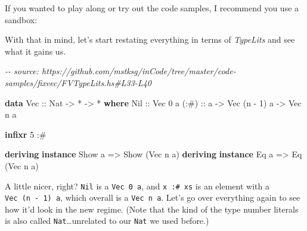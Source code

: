 \documentclass[]{article}
\newenvironment{Shaded}{}{}
\newcommand{\CommentTok}[1]{\textcolor[rgb]{0.38,0.63,0.69}{\textit{#1}}}
\newcommand{\DataTypeTok}[1]{\textcolor[rgb]{0.56,0.13,0.00}{#1}}
\newcommand{\DecValTok}[1]{\textcolor[rgb]{0.25,0.63,0.44}{#1}}
\newcommand{\ExtensionTok}[1]{#1}
\newcommand{\KeywordTok}[1]{\textcolor[rgb]{0.00,0.44,0.13}{\textbf{#1}}}
\newcommand{\NormalTok}[1]{#1}
\newcommand{\OperatorTok}[1]{\textcolor[rgb]{0.40,0.40,0.40}{#1}}
\newcommand{\OtherTok}[1]{\textcolor[rgb]{0.00,0.44,0.13}{#1}}
\begin{document}
If you wanted to play along or try out the code samples, I recommend you use a
sandbox:

\begin{Shaded}
\end{Shaded}

With that in mind, let's start restating everything in terms of \emph{TypeLits}
and see what it gains us.

\begin{Shaded}
\begin{Highlighting}[]
\CommentTok{{-}{-} source: https://github.com/mstksg/inCode/tree/master/code{-}samples/fixvec/FVTypeLits.hs\#L33{-}L40}

\KeywordTok{data} \DataTypeTok{Vec}\OtherTok{ ::} \DataTypeTok{Nat} \OtherTok{{-}\textgreater{}} \OperatorTok{*} \OtherTok{{-}\textgreater{}} \OperatorTok{*} \KeywordTok{where}
    \DataTypeTok{Nil}\OtherTok{  ::} \DataTypeTok{Vec} \DecValTok{0}\NormalTok{ a}
\OtherTok{    (:\#) ::}\NormalTok{ a }\OtherTok{{-}\textgreater{}} \DataTypeTok{Vec}\NormalTok{ (n }\OperatorTok{{-}} \DecValTok{1}\NormalTok{) a }\OtherTok{{-}\textgreater{}} \DataTypeTok{Vec}\NormalTok{ n a}

\KeywordTok{infixr} \DecValTok{5} \OperatorTok{:\#}

\KeywordTok{deriving} \KeywordTok{instance} \DataTypeTok{Show}\NormalTok{ a }\OtherTok{=\textgreater{}} \DataTypeTok{Show}\NormalTok{ (}\DataTypeTok{Vec}\NormalTok{ n a)}
\KeywordTok{deriving} \KeywordTok{instance} \DataTypeTok{Eq}\NormalTok{ a }\OtherTok{=\textgreater{}} \DataTypeTok{Eq}\NormalTok{ (}\DataTypeTok{Vec}\NormalTok{ n a)}
\end{Highlighting}
\end{Shaded}

A little nicer, right? \texttt{Nil} is a \texttt{Vec\ 0\ a}, and
\texttt{x\ :\#\ xs} is an element with a \texttt{Vec\ (n\ -\ 1)\ a}, which
overall is a \texttt{Vec\ n\ a}. Let's go over everything again to see how it'd
look in the new regime. (Note that the kind of the type number literals is also
called \texttt{Nat}\ldots unrelated to our \texttt{Nat} we used before.)
\end{document}
